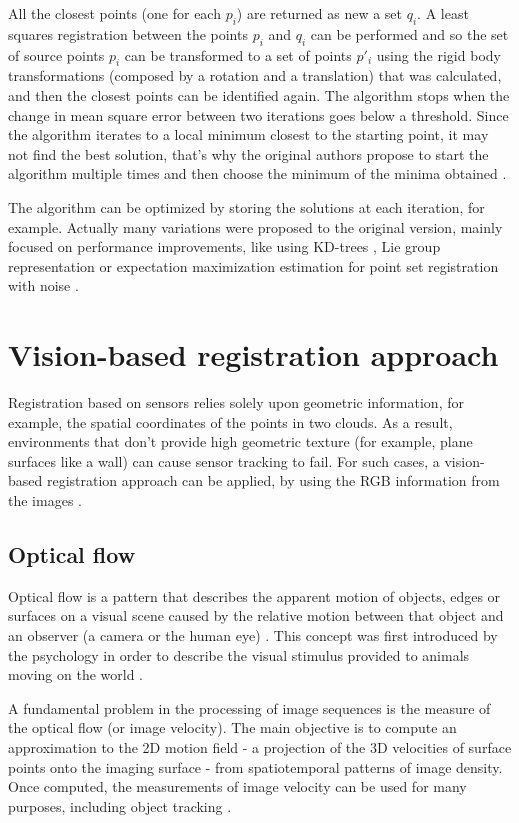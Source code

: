 \documentclass[msc, a4paper, classic, en]{ufbathesis}
\begin{document}
All the closest points (one for each $p_i$) are returned as new a set ${q_i}$. A least squares registration between the points $p_i$ and $q_i$ can be performed and so the set of source points $p_i$ can be transformed to a set of points $p'_i$ using the rigid body transformations (composed by a rotation and a translation) that was calculated, and then the closest points can be identified again. The algorithm stops when the change in mean square error between two iterations goes below a threshold. Since the algorithm iterates to a local minimum closest to the starting point, it may not find the best solution, that's why the original authors propose to start the algorithm multiple times and then choose the minimum of the minima obtained \cite{icp}.

The algorithm can be optimized by storing the solutions at each iteration, for example. Actually many variations were proposed to the original version, mainly focused on performance improvements, like using KD-trees \cite{zhang1994}, Lie group representation \cite{Dong201467} or expectation maximization estimation for point set registration with noise \cite{6957732}.

\section{Vision-based registration approach}

Registration based on sensors relies solely upon geometric information, for example, the spatial coordinates of the points in two clouds. As a result, environments that don't provide high geometric texture (for example, plane surfaces like a wall) can cause sensor tracking to fail. For such cases, a vision-based registration approach can be applied, by using the RGB information from the images \cite{kinectkanade}. 
\subsection{Optical flow}

Optical flow is a pattern that describes the apparent motion of objects, edges or surfaces on a visual scene caused by the relative motion between that object and an observer (a camera or the human eye) \cite{burton1978thinking}. This concept was first introduced by the psychology in order to describe the visual stimulus provided to animals moving on the world \cite{gibson1950perception}.

A fundamental problem in the processing of image sequences is the measure of the optical flow (or image velocity). The main objective is to compute an approximation to the 2D motion field - a projection of the 3D velocities of surface points onto the imaging surface - from spatiotemporal patterns of image density. Once computed, the measurements of image velocity can be used for many purposes, including object tracking \cite{opticalflow}.
\end{document}
